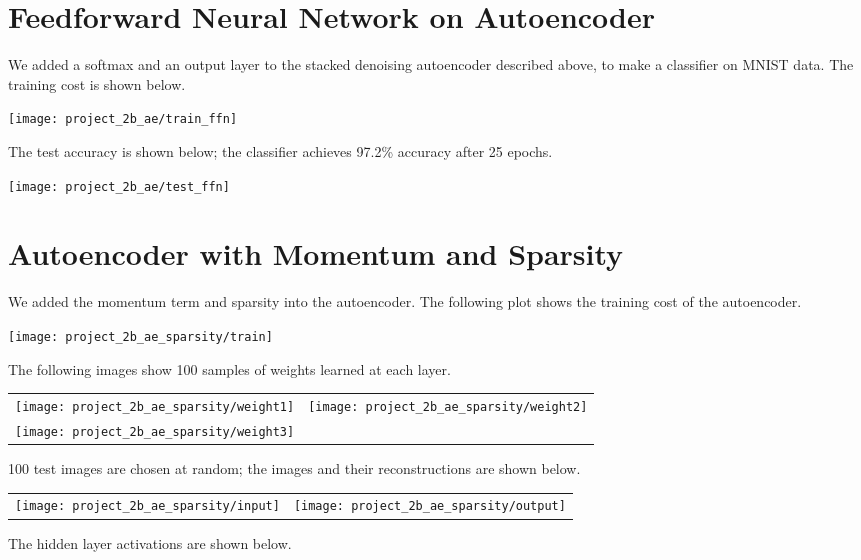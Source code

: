 \section*{Feedforward Neural Network on Autoencoder}

We added a softmax and an output layer to the stacked denoising autoencoder
described above, to make a classifier on MNIST data. The training cost is shown 
below.

\begin{center}
    \texttt{[image: project\_2b\_ae/train\_ffn]}
\end{center}

The test accuracy is shown below; the classifier achieves 97.2\% accuracy after
25 epochs.

\begin{center}
    \texttt{[image: project\_2b\_ae/test\_ffn]}
\end{center}

\section*{Autoencoder with Momentum and Sparsity}

We added the momentum term and sparsity into the autoencoder. The following plot
shows the training cost of the autoencoder.

\begin{center}
    \texttt{[image: project\_2b\_ae\_sparsity/train]}
\end{center}

The following images show 100 samples of weights learned at each layer.

\begin{longtabu}{X[c]X[c]}
    \texttt{[image: project\_2b\_ae\_sparsity/weight1]} &
    \texttt{[image: project\_2b\_ae\_sparsity/weight2]} \\
    \texttt{[image: project\_2b\_ae\_sparsity/weight3]}
\end{longtabu}

100 test images are chosen at random; the images and their reconstructions are
shown below.

\begin{longtabu}{X[c]X[c]}
    \texttt{[image: project\_2b\_ae\_sparsity/input]} &
    \texttt{[image: project\_2b\_ae\_sparsity/output]}
\end{longtabu}

The hidden layer activations are shown below.

